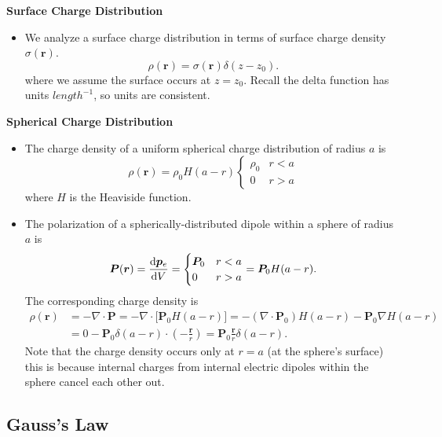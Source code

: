 \documentclass[11pt, a4paper]{article}
\renewcommand{\vec}[1]{\bm{#1}} %
\renewcommand{\r}{\vec{r}}
\newcommand{\pe}{\vec{p}_{e}}  %
\renewcommand{\div}{\nabla \cdot}
\renewcommand{\grad}{\nabla}
\begin{document}
\textbf{Surface Charge Distribution}
\begin{itemize}
	\item We analyze a surface charge distribution in terms of surface charge density $ \sigma(\r) $. 
	\begin{equation*}
		\rho(\r) = \sigma(\r) \delta(z - z_{0}).
	\end{equation*}
	where we assume the surface occurs at $ z = z_{0} $. Recall the delta function has units $ \si{length}^{-1} $, so units are consistent.
\end{itemize}

\textbf{Spherical Charge Distribution}
\begin{itemize}	
	\item The charge density of a uniform spherical charge distribution of radius $ a $ is
	\begin{equation*}
		\rho(\r) = \rho_{0}H(a - r)
		\begin{cases}
			\rho_{0} & r < a\\
			0 & r > a
		\end{cases}
	\end{equation*}
	where $ H $ is the Heaviside function.
	
	\item The polarization of a spherically-distributed dipole within a sphere of radius $ a $ is 
	\begin{equation*}
		\vec{P}(\r) = \dv{\pe}{V} = 
		\begin{cases}
			\vec{P}_{0} & r < a\\
			0 & r > a
		\end{cases}
		= \vec{P}_{0}H(a - r).
	\end{equation*}
	The corresponding charge density is
	\begin{align*}
		\rho(\r) &= - \div \vec{P} = - \div \big[\vec{P}_{0}H(a - r)\big] = - (\div \vec{P}_{0})H(a - r) - \vec{P}_{0} \grad H(a -r)\\
		&= 0 - \vec{P}_{0} \delta(a-r) \cdot \left (-\frac{\r}{r}\right) = \vec{P}_{0}\frac{\r}{r} \delta(a-r).
	\end{align*}
	Note that the charge density occurs only at $ r = a $ (at the sphere's surface) this is because internal charges from internal electric dipoles within the sphere cancel each other out.
\end{itemize}

\subsection{Gauss's Law}
\end{document}
